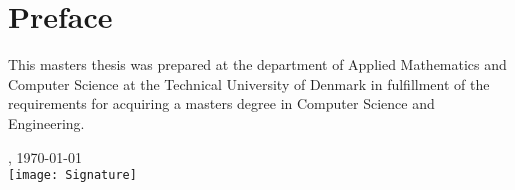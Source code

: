 \chapter{Preface}
This masters thesis was prepared at the department of Applied Mathematics and Computer Science at the Technical University of Denmark in fulfillment of the requirements for acquiring a masters degree in Computer Science and Engineering.

\vfill

{
\centering
    \thesislocation{}, \today\\[1cm]
    \hspace{3cm}\texttt{[image: Signature]}\\[1cm]
\begin{flushright}
    \thesisauthor{}
\end{flushright}
}
